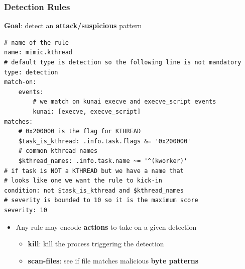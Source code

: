 \documentclass[10pt,aspectratio=169, colorlinks=true, linkcolor=circlBlue]{beamer}
\begin{document}
\begin{frame}[fragile]
	\frametitle{Detection Rules}
	\textbf{Goal}: detect an \textbf{attack/suspicious} pattern

	\centering\begin{minipage}{0.8\textwidth}
		\begin{verbatim}
# name of the rule
name: mimic.kthread
# default type is detection so the following line is not mandatory
type: detection
match-on:
    events:
        # we match on kunai execve and execve_script events
        kunai: [execve, execve_script]
matches:
    # 0x200000 is the flag for KTHREAD
    $task_is_kthread: .info.task.flags &= '0x200000'
    # common kthread names 
    $kthread_names: .info.task.name ~= '^(kworker)'
# if task is NOT a KTHREAD but we have a name that 
# looks like one we want the rule to kick-in
condition: not $task_is_kthread and $kthread_names
# severity is bounded to 10 so it is the maximum score
severity: 10
	\end{verbatim}
	\end{minipage}

	\begin{itemize}
		\item[] Any rule may encode \textbf{actions} to take on a given detection
		      \begin{itemize}
			      \item \textbf{kill}: kill the process triggering the detection
			      \item \textbf{scan-files}: see if file matches malicious \textbf{byte patterns}
		      \end{itemize}
	\end{itemize}

\end{frame}
\end{document}
